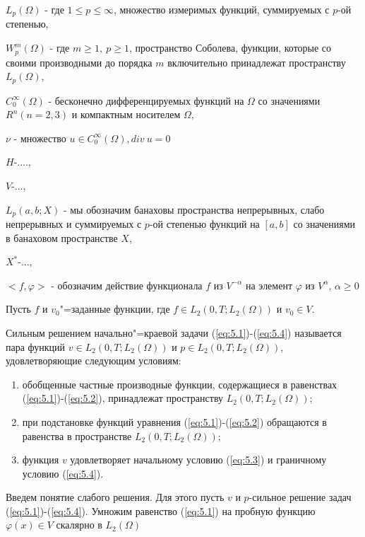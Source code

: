$L_p(\Omega)$ - где $1\leqslant p\leqslant\infty$, множество измеримых функций, суммируемых с $p$-ой степенью,

$W_p^m(\Omega)$ - где $m\geqslant 1, \ p\geqslant 1$, пространство Соболева,
функции, которые со своими производными до порядка $m$ включительно принадлежат пространству $L_p(\Omega)$,

$C_0^{\infty}(\Omega)$ - бесконечно дифференцируемых функций на $\Omega$ со значениями $R^n(n=2, 3)$ и компактным носителем $\Omega$,

$\nu$ - множество ${u\in C_0^{\infty}(\Omega), div \ u=0}$

$H$-....,

$V$-...,

$L_p(a, b;X)$ - мы обозначим банаховы пространства непрерывных, слабо непрерывных и суммируемых с $p$-ой степенью функций на $[a, b]$ со значениями в
банаховом пространстве $X$,

$X^*$-...,

$<f,\varphi>$ - обозначим действие функционала $f$ из $V^{-\alpha}$ на элемент $\varphi$ из $V^{\alpha}$, $\alpha\geqslant 0$

Пусть $f$ и $v_0$"=заданные функции,
где $f\in L_2(0, T; L_2(\Omega))$ и $v_0\in V$.

\begin{definition}
    Сильным решением начально"=краевой задачи (\ref{eq:5.1})-(\ref{eq:5.4}) называется пара функций $v\in L_2(0, T; L_2(\Omega))$ и
    $p\in L_2(0, T; L_2(\Omega))$, удовлетворяющие следующим условиям:
\end{definition}

\begin{enumerate} 
    \item обобщенные частные производные функции, содержащиеся в равенствах (\ref{eq:5.1})-(\ref{eq:5.2}), принадлежат пространству $L_2(0, T; L_2(\Omega))$;
    \item при подстановке функций уравнения (\ref{eq:5.1})-(\ref{eq:5.2}) обращаются в равенства в пространстве $L_2(0, T; L_2(\Omega))$;
    \item функция $v$ удовлетворяет начальному условию (\ref{eq:5.3}) и граничному условию (\ref{eq:5.4}).
\end{enumerate}

Введем понятие слабого решения. Для этого пусть $v$ и $p$-сильное решение задач (\ref{eq:5.1})-(\ref{eq:5.4}).
Умножим равенство (\ref{eq:5.1}) на пробную функцию $\varphi (x)\in V$ скалярно в $L_2(\Omega)$

